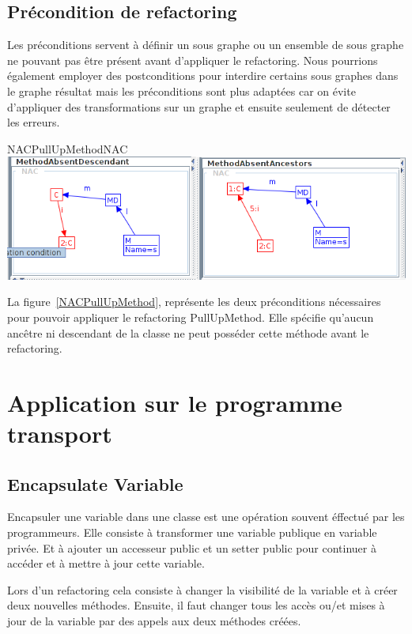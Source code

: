 \documentclass[a4paper, 12pt]{article}
\begin{document}
  \subsection{Précondition de refactoring}
  Les préconditions servent à définir un sous graphe ou un ensemble de sous graphe ne pouvant pas être présent avant d'appliquer le refactoring.
  Nous pourrions également employer des postconditions pour interdire certains sous graphes dans le graphe résultat
  mais les préconditions sont plus adaptées car on évite d'appliquer des transformations sur un graphe et ensuite seulement de détecter les erreurs.

  \begin{myfig}{NACPullUpMethod}{NAC}
    \includegraphics[width=\textwidth]{NACPullUpMethod.png}
  \end{myfig}

  La figure~\ref{NACPullUpMethod}, représente les deux préconditions nécessaires pour pouvoir appliquer le refactoring PullUpMethod.
  Elle spécifie qu'aucun ancêtre ni descendant de la classe ne peut posséder cette méthode avant le refactoring.


  \section{Application sur le programme transport}

  \subsection{Encapsulate Variable}

  Encapsuler une variable dans une classe est une opération souvent éffectué par les programmeurs.
  Elle consiste à transformer une variable publique en variable privée.
  Et à ajouter un accesseur public et un setter public pour continuer à accéder et à mettre à jour cette variable.

  Lors d'un refactoring cela consiste à changer la visibilité de la variable et à créer deux nouvelles méthodes.
  Ensuite, il faut changer tous les accès ou/et mises à jour de la variable par des appels aux deux méthodes créées.
\end{document}
